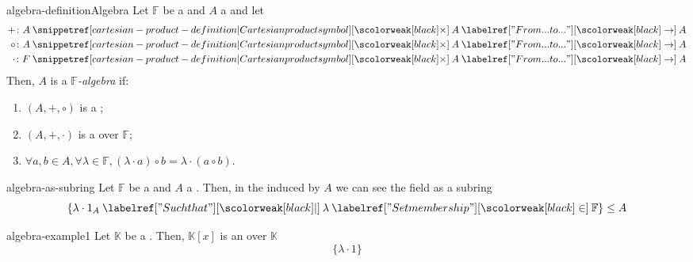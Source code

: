 \documentclass[preview]{standalone}
\begin{document}

\begin{snippetdefinition}{algebra-definition}{Algebra}
    Let \(\mathbb{F}\) be a \field and \(A\) a \set and let
    \begin{align*}
        + \colon A \cartesianprod A \fromto A \\
        \circ \colon A \cartesianprod A \fromto A \\
        \cdot \colon F \cartesianprod A \fromto A
    \end{align*}
    Then, \(A\) is a \emph{\(\mathbb{F}\)-algebra} if:
    \begin{enumerate}
        \item \((A, +, \circ)\) is a \ring;
        \item \((A, +, \cdot)\) is a \vectorspace over \(\mathbb{F}\);
        \item \(\forall a,b \in A, \forall \lambda \in \mathbb{F}, (\lambda \cdot a) \circ b = \lambda \cdot (a\circ b)\).
    \end{enumerate}
\end{snippetdefinition}

\begin{snippet}{algebra-as-subring}
    Let \(\mathbb{F}\) be a \field and \(A\) a \ring.
    Then, in the \algebra induced by \(A\)
    we can see the field as a subring
    \[
        \{\lambda \cdot 1_A \suchthat \lambda \in \mathbb{F}\} \leq A
    \]
\end{snippet}

\begin{snippetexample}{algebra-example1}{}
    Let \(\mathbb{K}\) be a \field.
    Then, \(\mathbb{K}[x]\) is an \algebra over \(\mathbb{K}\)
    \[
        \{\lambda \cdot 1\}
    \]
\end{snippetexample}
\end{document}
